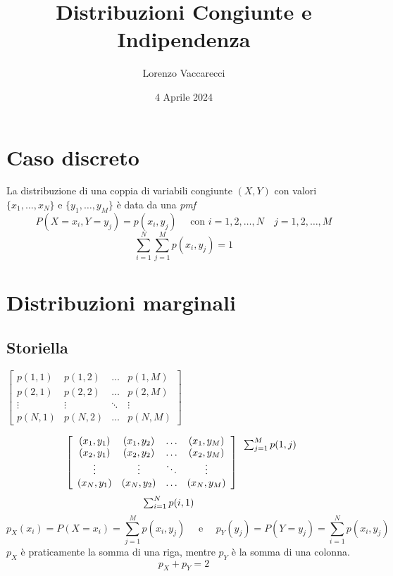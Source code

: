 \documentclass[12pt]{article}
\title{Distribuzioni Congiunte e Indipendenza}
\author{Lorenzo Vaccarecci}
\date{4 Aprile 2024}
\begin{document}
\maketitle
\section{Caso discreto}
La distribuzione di una coppia di variabili congiunte $(X,Y)$ con valori $\{x_{1},\ldots,x_{N}\}$ e $\{y_{1},\ldots,y_{M}\}$ è data da una \textit{pmf}
\begin{equation*}
    P(X= x_{i}, Y = y_{j}) = p(x_{i},y_{j}) \quad \text{ con } i = 1,2,\ldots,N \quad j = 1,2,\ldots,M
\end{equation*}
\begin{equation*}
    \sum_{i=1}^{N} \sum_{j=1}^{M} p(x_{i},y_{j}) = 1
\end{equation*}
\section{Distribuzioni marginali}
\subsection*{Storiella}
\begin{center}
    \(
        \begin{bmatrix}
            p(1,1) & p(1,2) & \ldots & p(1,M) \\ 
            p(2,1) & p(2,2) & \ldots & p(2,M) \\
            \vdots & \vdots & \ddots & \vdots \\
            p(N,1) & p(N,2) & \ldots & p(N,M)
        \end{bmatrix}    
    \)
\end{center}
$$
\left[\begin{array}{cccc}  
    (x_{1},y_{1}) & (x_{1},y_{2}) & \ldots & (x_{1},y_{M}) \\
    (x_{2},y_{1}) & (x_{2},y_{2}) & \ldots & (x_{2},y_{M}) \\
    \vdots & \vdots & \ddots & \vdots \\
    (x_{N},y_{1}) & (x_{N},y_{2}) & \ldots & (x_{N},y_{M})
\end{array}\right] \begin{array}{c}
	\sum_{j=1}^{M} p(1,j) \\
	\vphantom{} \\
    \vphantom{} \\
    \vphantom{}
\end{array}
$$
$$
\begin{array}{cccc}
    \sum_{i=1}^{N} p(i,1) & \hphantom{} & \hphantom{} & \hphantom{} 
\end{array}
$$
\begin{equation*}
    p_{X}(x_{i}) = P(X=x_{i}) = \sum_{j=1}^{M} p(x_{i},y_{j}) \quad \text{ e } \quad p_{Y}(y_{j}) = P(Y=y_{j}) = \sum_{i=1}^{N} p(x_{i},y_{j})
\end{equation*}
$p_{X}$ è praticamente la somma di una riga, mentre $p_{Y}$ è la somma di una colonna.
\begin{equation*}
    p_{X}+p_{Y} = 2
\end{equation*}
\end{document}

